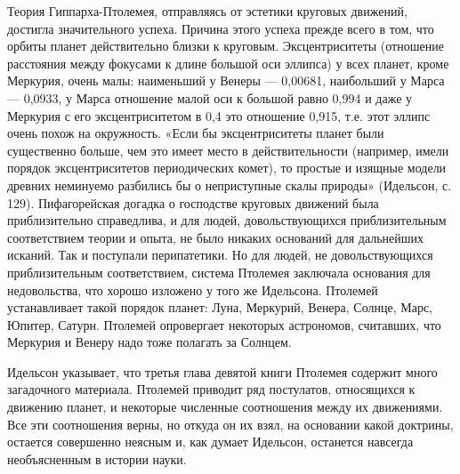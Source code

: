 Теория Гиппарха-Птолемея,  отправляясь от эстетики  круговых движений,
достигла  значительного  успеха.  Причина этого  успеха  прежде  всего
в   том,  что   орбиты   планет  действительно   близки  к   круговым.
Эксцентриситеты (отношение  расстояния между фокусами к  длине большой
оси эллипса)  у всех  планет, кроме  Меркурия, очень  малы: наименьший
у  Венеры  ---  0,00681,  наибольший  у  Марса  ---  0,0933,  у  Марса
отношение  малой  оси к  большой  равно  0,994  и  даже у  Меркурия  с
его  эксцентриситетом в  0,4  это отношение  0,915,  т.е. этот  эллипс
очень  похож  на  окружность.  «Если бы  эксцентриситеты  планет  были
существенно больше, чем это  имеет место в действительности (например,
имели  порядок эксцентриситетов  периодических  комет),  то простые  и
изящные  модели древних  неминуемо разбились  бы о  неприступные скалы
природы»  (Идельсон,  с.  129).  Пифагорейская  догадка  о  господстве
круговых  движений  была  приблизительно  справедлива,  и  для  людей,
довольствующихся  приблизительным  соответствием  теории и  опыта,  не
было  никаких  оснований  для  дальнейших  исканий.  Так  и  поступали
перипатетики.  Но  для   людей,  не  довольствующихся  приблизительным
соответствием, система Птолемея  заключала основания для недовольства,
что хорошо изложено у того  же Идельсона. Птолемей устанавливает такой
порядок планет: Луна, Меркурий,  Венера, Солнце, Марс, Юпитер, Сатурн.
Птолемей опровергает  некоторых астрономов, считавших, что  Меркурия и
Венеру надо тоже полагать за Солнцем.

Идельсон указывает,  что третья глава девятой  книги Птолемея содержит
много  загадочного   материала.  Птолемей  приводит   ряд  постулатов,
относящихся к движению планет, и некоторые численные соотношения между
их движениями.  Все эти соотношения  верны, но  откуда он их  взял, на
основании какой  доктрины, остается  совершенно неясным и,  как думает
Идельсон, останется навсегда необъясненным в истории науки.

